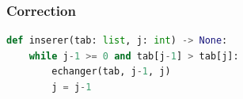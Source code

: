 \documentclass[svgnames,11pt]{beamer}
\begin{document}
\begin{frame}[fragile]
    \frametitle{Correction}

    \begin{center}
\begin{lstlisting}[language=Python , basicstyle=\ttfamily\small, xleftmargin=2em, xrightmargin=0em]
def inserer(tab: list, j: int) -> None:
    while j-1 >= 0 and tab[j-1] > tab[j]:
        echanger(tab, j-1, j)
        j = j-1
\end{lstlisting}
        \end{center}
    \begin{center}
        \label{CODE}
        \end{center}

\end{frame}
\end{document}

